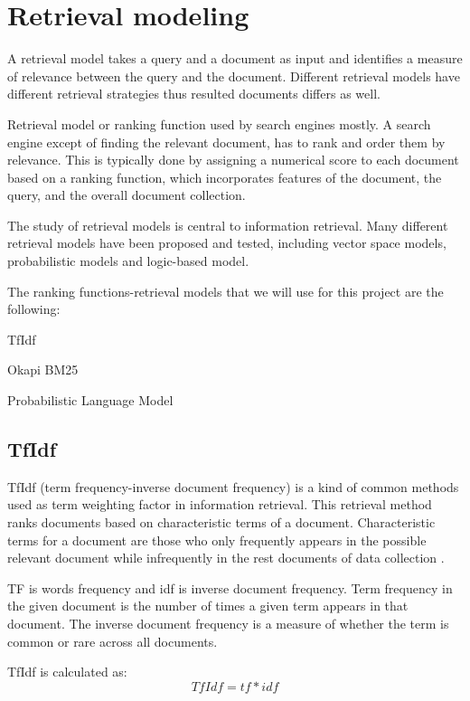\section{Retrieval modeling}

A retrieval model takes a query and a document as input and identifies a measure of relevance between the query and the document. Different retrieval models have different retrieval strategies thus resulted documents differs as well.

Retrieval model or ranking function used by search engines mostly. A search engine except of finding the relevant document, has to rank and order them by relevance. This is typically done by assigning a numerical score to each document based on a ranking function, which incorporates features of the document, the query, and the overall document collection.

The study of retrieval models is central to information retrieval. Many different retrieval models have been proposed and tested, including vector space models, probabilistic models and logic-based model.

The ranking functions-retrieval models that we will use for this project are the following:
\begin{list}{.}{}
\item TfIdf
\item Okapi BM25
\item Probabilistic Language Model
\end{list}

\subsection{TfIdf}

TfIdf (term frequency-inverse document frequency) is a kind of common methods used as term weighting factor in information retrieval. This retrieval method ranks documents based on characteristic terms of a document. Characteristic terms for a document are those who only frequently appears in the possible relevant document while infrequently in the rest documents of data collection \cite{ShouningSujuanYan}.

TF is words frequency and idf is inverse document frequency. Term frequency in the given document is the number of times a given term appears in that document. The inverse document frequency is a measure of whether the term is common or rare across all documents.

TfIdf  is calculated as:
\begin{equation}
	TfIdf = tf * idf
\end{equation}

